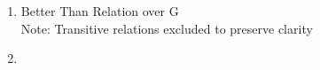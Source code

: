 \documentclass[12pt]{article}
\newenvironment{solution}[2][Solution]{ \begin{trivlist}
\item[\hskip \labelsep {\bfseries #1}]}{\end{trivlist}}
\begin{document}
\begin{solution}{7}
\item[]
\begin{enumerate}[label=\alph*)]
\item \begin{minipage}[t]{\linewidth}
          \raggedright
          Better Than Relation over G\\
           \footnotesize Note: Transitive relations excluded to preserve clarity
          \end{minipage}
\item

\end{enumerate}
\end{solution}
\end{document}
